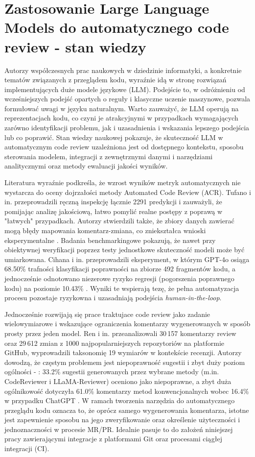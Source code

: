 \section{Zastosowanie Large Language Models do automatycznego code review - stan wiedzy}
\label{sec:llm_acr_sota}

Autorzy współczesnych prac naukowych w dziedzinie informatyki, a konkretnie tematów związanych z przeglądem kodu, wyraźnie idą w stronę
rozwiązań implementujących duże modele językowe (LLM). Podejście to, w odróżnieniu od wcześniejszych podejść
opartych o reguły i klasyczne uczenie maszynowe, pozwala formułować uwagi w języku naturalnym. Warto
zauważyć, że LLM operują na reprezentacjach kodu, co czyni je atrakcyjnymi w przypadkach wymagających zarówno
identyfikacji problemu, jak i uzasadnienia i wskazania lepszego podejścia lub co poprawić.
Stan wiedzy naukowej pokazuje, że skuteczność LLM w automatycznym code review uzależniona jest od dostępnego kontekstu,
sposobu sterowania modelem, integracji z zewnętrznymi danymi i narzędziami analitycznymi oraz metody
ewaluacji jakości wyników.

Literatura wyraźnie podkreśla, że wzrost wyników metryk automatycznych nie wystarcza do oceny dojrzałości
metody Automated Code Review (ACR). Tufano i in. przeprowadzili ręczną inspekcję łącznie 2291 predykcji i zauważyli,
że pomijając analizę jakościową, łatwo pomylić realne postępy z poprawą
w "łatwych" przypadkach. Autorzy stwierdzili także, że zbiory danych zawierać mogą błędy mapowania komentarz-zmiana, co
zniekształca wnioski eksperymentalne \cite{Tufano2024CodeReviewAutomation}. Badania benchmarkingowe pokazują, że
nawet przy obiektywnej weryfikacji poprzez testy jednostkowe skuteczność modeli może być umiarkowana. Cihana i in.
przeprowadzili eksperyment, w którym GPT-4o osiąga 68.50\% trafności klasyfikacji poprawności na zbiorze 492 fragmentów kodu,
a jednocześnie odnotowano niezerowe ryzyko regresji (pogorszenia poprawnego kodu) na poziomie 10.43\% \cite{Cihan2025EvaluatingLLMsForCodeReview}. 
Wyniki te wspierają tezę, że pełna automatyzacja procesu pozostaje ryzykowna i uzasadniają podejścia \emph{human-in-the-loop}.

Jednocześnie rozwijają się prace traktujace code review jako zadanie wielowymiarowe
i wskazujące ograniczenia komentarzy wygenerowanych w sposób prosty przez jeden model. Ren i in. przeanalizowali
30\,157 komentarzy review oraz 29\,612 zmian z 1000 najpopularniejszych repozytoriów na platformie GitHub, wyprowadzili
taksonomię 19 wymiarów w kontekście recenzji. Autorzy dowodzą, że częstym problemem jest niepoprawność sugestii i zbyt duży poziom ogólności
- : 33.2\% sugestii generowanych przez wybrane metody (m.in. 
CodeReviewer i LLaMA-Reviewer) oceniono jako niepoprawne, a zbyt duża ogólnikowość dotyczyła 61.0\% komentarzy 
metod konwencjonalnych wobec 16.4\% w przypadku ChatGPT \cite{Ren2025HydraReviewer}. W ramach tworzenia narzędzia do
automatycznego przeglądu kodu oznacza to, że oprócz samego wygenerowania komentarza, istotne jest zapewnienie sposobu
na jego zweryfikowanie oraz określenie użyteczności i jednoznaczności w procesie MR/PR. Idealnie pasuje to do założeń
niniejszej pracy zawierającymi integracje z platformami Git oraz procesami ciągłej integracji (CI).

